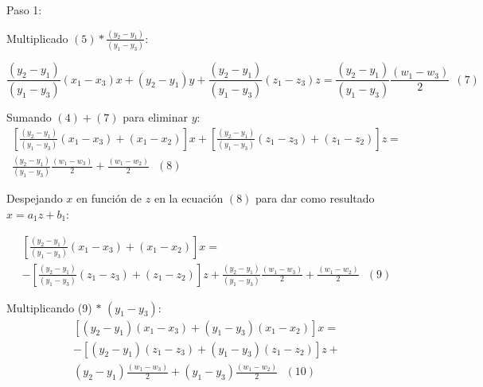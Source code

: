         \newpage


        Paso 1:
        
        Multiplicado $(5)\ast \frac{( y_{2}-y_{1}) }{(y_{1}-y_{3})}$: 

        \begin{equation*}
                \frac{ \left( y_{2}-y_{1} \right) }{ \left( y_{1}-y_{3} \right) } \left( x_{1}-x_{3} \right) x+ \left( y_{2}-y_{1} \right) y+\frac{ \left( y_{2}-y_{1} \right) }{ \left( y_{1}-y_{3} \right) } \left( z_{1}-z_{3} \right) z= \frac{ \left( y_{2}-y_{1} \right) }{ \left( y_{1}-y_{3} \right) }\frac{ \left( w_{1} - w_{3} \right) }{2} ~~\left( 7 \right)
        \end{equation*}
        
        Sumando $(4) +(7)$ para eliminar $y$:
        \begin{multline*}
             \left[ \frac{ \left( y_{2}-y_{1} \right) }{ \left( y_{1}-y_{3} \right) } \left( x_{1}-x_{3} \right) +  \left( x_{1}-x_{2} \right)  \right] x+ \left[ \frac{ \left( y_{2}-y_{1} \right) }{ \left( y_{1}-y_{3} \right) } \left( z_{1}-z_{3} \right) + \left( z_{1}-z_{2} \right)  \right] z= \\ \frac{ \left( y_{2}-y_{1} \right) }{ \left( y_{1}-y_{3} \right) }\frac{ \left( w_{1} - w_{3} \right) }{2}+\frac{ \left( w_{1} - w_{2} \right) }{2}~~~ \left( 8 \right)            
        \end{multline*}

        Despejando $x$ en función de $z$ en la ecuación $(8)$ para dar como resultado  $x= a_{1}z+ b_{1}$:

        \begin{multline*}
             \left[ \frac{ \left( y_{2}-y_{1} \right) }{ \left( y_{1}-y_{3} \right) } \left( x_{1}-x_{3} \right) +  \left( x_{1}-x_{2} \right)  \right] x=\\- \left[ \frac{ \left( y_{2}-y_{1} \right) }{ \left( y_{1}-y_{3} \right) } \left( z_{1}-z_{3} \right) + \left( z_{1}-z_{2} \right)  \right] z+ \frac{ \left( y_{2}-y_{1} \right) }{ \left( y_{1}-y_{3} \right) }\frac{ \left( w_{1} - w_{3} \right) }{2}+\frac{ \left( w_{1} - w_{2} \right) }{2}~~~ \left( 9 \right) 
        \end{multline*}

        Multiplicando (9) $\ast$ $\left( y_{1}-y_{3} \right)$:
        \begin{multline*}
             \left[  \left( y_{2}-y_{1} \right)  \left( x_{1}-x_{3} \right) +  \left( y_{1}-y_{3} \right)  \left( x_{1}-x_{2} \right)  \right] x=\\- \left[  \left( y_{2}-y_{1} \right)  \left( z_{1}-z_{3} \right) + \left( y_{1}-y_{3} \right)  \left( z_{1}-z_{2} \right)  \right] z+\\  \left( y_{2}-y_{1} \right) \frac{ \left( w_{1} - w_{3} \right) }{2}+ \left( y_{1}-y_{3} \right) \frac{ \left( w_{1} - w_{2} \right) }{2}~~~ \left( 10 \right) 
        \end{multline*}
        

